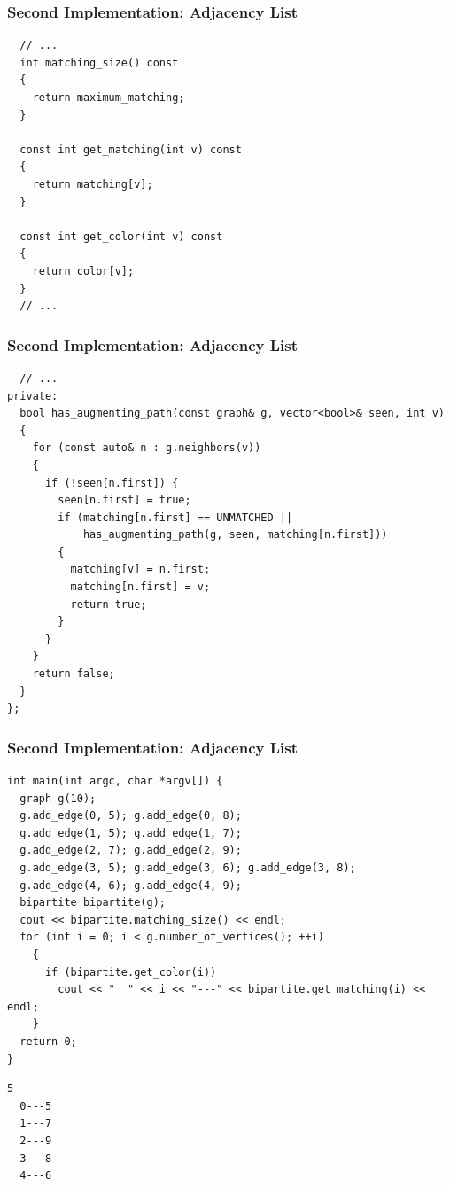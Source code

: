 \documentclass{beamer}
\begin{document}
\begin{frame}[containsverbatim]
\frametitle{Second Implementation: Adjacency List}
\scriptsize

\begin{lstlisting}
  // ...
  int matching_size() const
  {
    return maximum_matching;
  }

  const int get_matching(int v) const
  {
    return matching[v];
  }

  const int get_color(int v) const
  {
    return color[v];
  }
  // ...
\end{lstlisting}

\end{frame}

\begin{frame}[containsverbatim]
\frametitle{Second Implementation: Adjacency List}
\scriptsize

\begin{lstlisting}
  // ...
private:
  bool has_augmenting_path(const graph& g, vector<bool>& seen, int v)
  {
    for (const auto& n : g.neighbors(v))
    {
      if (!seen[n.first]) {
        seen[n.first] = true;
        if (matching[n.first] == UNMATCHED ||
            has_augmenting_path(g, seen, matching[n.first]))
        {
          matching[v] = n.first;
          matching[n.first] = v;
          return true;
        }
      }
    }
    return false;
  }
};
\end{lstlisting}

\end{frame}

\begin{frame}[containsverbatim]
\frametitle{Second Implementation: Adjacency List}

\tiny

\begin{lstlisting}
int main(int argc, char *argv[]) {
  graph g(10);
  g.add_edge(0, 5); g.add_edge(0, 8);
  g.add_edge(1, 5); g.add_edge(1, 7);
  g.add_edge(2, 7); g.add_edge(2, 9);
  g.add_edge(3, 5); g.add_edge(3, 6); g.add_edge(3, 8);
  g.add_edge(4, 6); g.add_edge(4, 9);
  bipartite bipartite(g);
  cout << bipartite.matching_size() << endl;
  for (int i = 0; i < g.number_of_vertices(); ++i)
    {
      if (bipartite.get_color(i))
        cout << "  " << i << "---" << bipartite.get_matching(i) << endl;
    }
  return 0;
}
\end{lstlisting}

\scriptsize

\begin{verbatim}
5
  0---5
  1---7
  2---9
  3---8
  4---6
\end{verbatim}

\end{frame}
\end{document}
